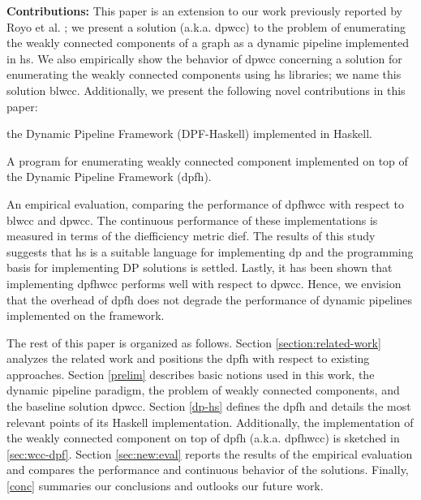 \textbf{Contributions:} 
This paper is an extension to our work previously reported by Royo et al. \cite{prole}; we present a solution (a.k.a. \acrshort{dpwcc}) to the problem of enumerating the weakly connected components of a graph as a dynamic pipeline implemented in \acrshort{hs}. We also empirically show the behavior of \acrshort{dpwcc} concerning a solution for enumerating the weakly connected components using \acrshort{hs} libraries; we name this solution \acrfull{blwcc}. 
Additionally,  we present the following novel contributions in this paper:
\begin{inparaenum}[i\upshape)]
\item the Dynamic Pipeline Framework (DPF-Haskell) implemented in Haskell. 
\item A program for enumerating weakly connected component implemented on top of the Dynamic Pipeline Framework (\acrshort{dpfh}).
\item An empirical evaluation, comparing the performance of 
\acrfull{dpfhwcc} with respect to \acrshort{blwcc} and \acrfull{dpwcc}. 
The continuous  performance of these implementations is measured in terms of the diefficiency metric dief\@t \cite{diefpaper}. The results of this study suggests that  \acrshort{hs} is a suitable language for implementing \acrshort{dp} and the programming basis for implementing DP solutions is settled. Lastly, it has been shown that implementing \acrshort{dpfhwcc} performs well with respect to \acrshort{dpwcc}. 
Hence, we envision that the overhead of \acrshort{dpfh} does not degrade the performance of dynamic pipelines implemented on the framework. 
\end{inparaenum}

The rest of this paper is organized as follows. 
Section \ref{section:related-work} analyzes the related work and positions the \acrlong{dpfh} with respect to existing approaches. Section \ref{prelim} describes basic notions used in this work, the dynamic pipeline paradigm, the problem of weakly connected components, and the baseline solution  \acrshort{dpwcc}.  
Section \ref{dp-hs}  defines the \acrlong{dpfh} 
and details the most relevant points of its Haskell implementation. Additionally, the implementation of the weakly connected component on top of  \acrlong{dpfh} (a.k.a. \acrfull{dpfhwcc}) is sketched in \autoref{sec:wcc-dpf}. Section \ref{sec:new:eval} reports the results of the empirical evaluation and compares the performance and continuous behavior of the solutions. Finally, \autoref{conc} summaries our conclusions and outlooks our future work. 
